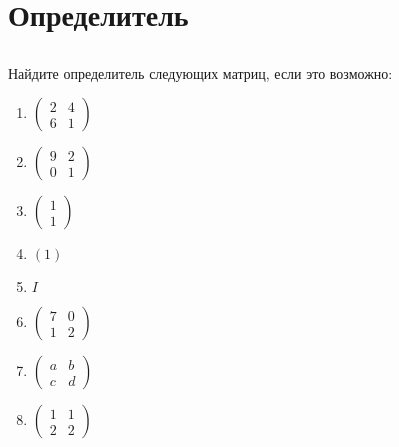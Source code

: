 \documentclass[11pt, a4paper]{extarticle}
\begin{document}
\section{Определитель}

\subsection{}
Найдите определитель следующих матриц, если это возможно:
	\begin{multicols}{4}
		\begin{enumerate}[label=\alph*)]
			\item $\begin{pmatrix}
			2 & 4 \\
			6 & 1
			\end{pmatrix}$
			
			\item $\begin{pmatrix}
			9 & 2 \\
			0 & 1
			\end{pmatrix}$
			
			\item $\begin{pmatrix}
			1 \\
			1
			\end{pmatrix}$
			
			\item $(1)$
			
			\item $I$
			
			\item $\begin{pmatrix}
			7 & 0 \\
			1 & 2
			\end{pmatrix}$
			
			\item $\begin{pmatrix}
			a & b \\
			c & d
			\end{pmatrix}$
			
			\item $\begin{pmatrix}
			1 & 1 \\
			2 & 2
			\end{pmatrix}$
		\end{enumerate}
	\end{multicols}
\end{document}
